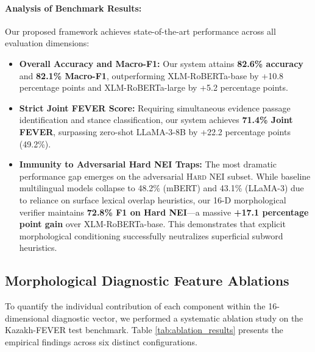 \paragraph{Analysis of Benchmark Results:}
Our proposed framework achieves state-of-the-art performance across all evaluation dimensions:
\begin{itemize}
    \item \textbf{Overall Accuracy and Macro-F1:} Our system attains \textbf{82.6\% accuracy} and \textbf{82.1\% Macro-F1}, outperforming XLM-RoBERTa-base by +10.8 percentage points and XLM-RoBERTa-large by +5.2 percentage points.
    \item \textbf{Strict Joint FEVER Score:} Requiring simultaneous evidence passage identification and stance classification, our system achieves \textbf{71.4\% Joint FEVER}, surpassing zero-shot LLaMA-3-8B by +22.2 percentage points (49.2\%).
    \item \textbf{Immunity to Adversarial Hard NEI Traps:} The most dramatic performance gap emerges on the adversarial \textsc{Hard NEI} subset. While baseline multilingual models collapse to 48.2\% (mBERT) and 43.1\% (LLaMA-3) due to reliance on surface lexical overlap heuristics, our 16-D morphological verifier maintains \textbf{72.8\% F1 on Hard NEI}---a massive \textbf{+17.1 percentage point gain} over XLM-RoBERTa-base. This demonstrates that explicit morphological conditioning successfully neutralizes superficial subword heuristics.
\end{itemize}

\subsection{Morphological Diagnostic Feature Ablations}
To quantify the individual contribution of each component within the 16-dimensional diagnostic vector, we performed a systematic ablation study on the Kazakh-FEVER test benchmark. Table \ref{tab:ablation_results} presents the empirical findings across six distinct configurations.

